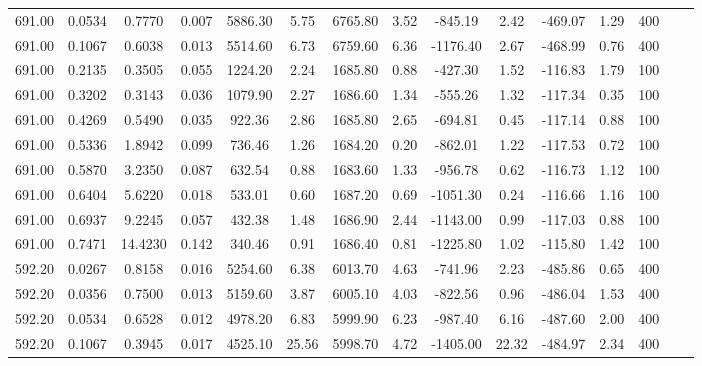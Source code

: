 \documentclass[%
 aip,
 jcp,
 sd,%
 amsmath,amssymb,
]{revtex4-1}
\begin{document}
\begin{table}[!htbp]
\begin{ruledtabular}
\begin{tabular}{ccccccccccccccc}
691.00 & 0.0534 & 0.7770  & 0.007 & 5886.30 & 5.75  & 6765.80 & 3.52 & -845.19  & 2.42  & -469.07 & 1.29 & 400 \\
691.00 & 0.1067 & 0.6038  & 0.013 & 5514.60 & 6.73  & 6759.60 & 6.36 & -1176.40 & 2.67  & -468.99 & 0.76 & 400 \\
691.00 & 0.2135 & 0.3505  & 0.055 & 1224.20 & 2.24  & 1685.80 & 0.88 & -427.30  & 1.52  & -116.83 & 1.79 & 100 \\
691.00 & 0.3202 & 0.3143  & 0.036 & 1079.90 & 2.27  & 1686.60 & 1.34 & -555.26  & 1.32  & -117.34 & 0.35 & 100 \\
691.00 & 0.4269 & 0.5490  & 0.035 & 922.36  & 2.86  & 1685.80 & 2.65 & -694.81  & 0.45  & -117.14 & 0.88 & 100 \\
691.00 & 0.5336 & 1.8942  & 0.099 & 736.46  & 1.26  & 1684.20 & 0.20 & -862.01  & 1.22  & -117.53 & 0.72 & 100 \\
691.00 & 0.5870 & 3.2350  & 0.087 & 632.54  & 0.88  & 1683.60 & 1.33 & -956.78  & 0.62  & -116.73 & 1.12 & 100 \\
691.00 & 0.6404 & 5.6220  & 0.018 & 533.01  & 0.60  & 1687.20 & 0.69 & -1051.30 & 0.24  & -116.66 & 1.16 & 100 \\
691.00 & 0.6937 & 9.2245  & 0.057 & 432.38  & 1.48  & 1686.90 & 2.44 & -1143.00 & 0.99  & -117.03 & 0.88 & 100 \\
691.00 & 0.7471 & 14.4230 & 0.142 & 340.46  & 0.91  & 1686.40 & 0.81 & -1225.80 & 1.02  & -115.80 & 1.42 & 100 \\
592.20 & 0.0267 & 0.8158  & 0.016 & 5254.60 & 6.38  & 6013.70 & 4.63 & -741.96  & 2.23  & -485.86 & 0.65 & 400 \\
592.20 & 0.0356 & 0.7500  & 0.013 & 5159.60 & 3.87  & 6005.10 & 4.03 & -822.56  & 0.96  & -486.04 & 1.53 & 400 \\
592.20 & 0.0534 & 0.6528  & 0.012 & 4978.20 & 6.83  & 5999.90 & 6.23 & -987.40  & 6.16  & -487.60 & 2.00 & 400 \\
592.20 & 0.1067 & 0.3945  & 0.017 & 4525.10 & 25.56 & 5998.70 & 4.72 & -1405.00 & 22.32 & -484.97 & 2.34 & 400
\end{tabular}
\end{ruledtabular}
\end{table}
\end{document}
